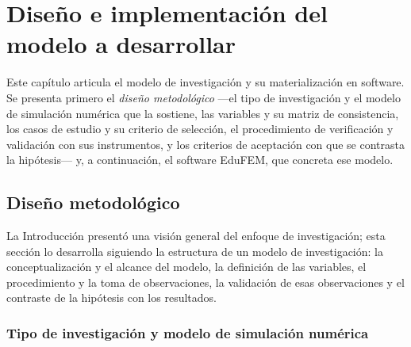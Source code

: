 \chapter{Diseño e implementación del modelo a desarrollar}
\label{cap:diseno}

Este capítulo articula el modelo de investigación y su materialización en software. Se presenta primero el \emph{diseño metodológico} —el tipo de investigación y el modelo de simulación numérica que la sostiene, las variables y su matriz de consistencia, los casos de estudio y su criterio de selección, el procedimiento de verificación y validación con sus instrumentos, y los criterios de aceptación con que se contrasta la hipótesis— y, a continuación, el software EduFEM, que concreta ese modelo.

\section{Diseño metodológico}
\label{sec:metodologia}

La Introducción presentó una visión general del enfoque de investigación; esta sección lo desarrolla siguiendo la estructura de un modelo de investigación: la conceptualización y el alcance del modelo, la definición de las variables, el procedimiento y la toma de observaciones, la validación de esas observaciones y el contraste de la hipótesis con los resultados.

\subsection{Tipo de investigación y modelo de simulación numérica}
\label{sec:proceso-met}

